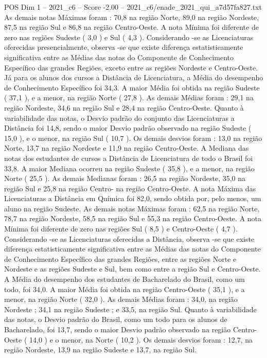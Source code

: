 \begin{textsample}{POS Dim 1 – 2021\_c6 – Score -2.00 – 2021\_c6/enade\_2021\_qui\_a7d57fa827.txt}
As demais notas Máximas foram : 70,8 na região Norte, 89,0 na região Nordeste, 87,5 na região Sul e 86,8 na região Centro-Oeste.
A nota Mínima foi diferente de zero nas regiões Sudeste ( 3,0 ) e Sul ( 4,3 ).
Considerando -se as Licenciaturas oferecidas presencialmente, observa -se que existe diferença estatisticamente significativa entre as Médias das notas do Componente de Conhecimento Específico das grandes Regiões, exceto entre as regiões Nordeste e Centro-Oeste.
Já para os alunos dos cursos a Distância de Licenciatura, a Média do desempenho de Conhecimento Específico foi 34,3.
A maior Média foi obtida na região Sudeste ( 37,1 ), e a menor, na região Norte ( 27,8 ).
As demais Médias foram : 29,1 na região Nordeste, 34,6 na região Sul e 28,4 na região Centro-Oeste.
Quanto à variabilidade das notas, o Desvio padrão do conjunto das Licenciaturas a Distância foi 14,8, sendo o maior Desvio padrão observado na região Sudeste ( 15,0 ), e o menor, na região Sul ( 10,7 ).
Os demais desvios foram : 13,0 na região Norte, 13,7 na região Nordeste e 11,9 na região Centro-Oeste.
A Mediana das notas dos estudantes de cursos a Distância de Licenciatura de todo o Brasil foi 33,8.
A maior Mediana ocorreu na região Sudeste ( 35,8 ), e a menor, na região Norte ( 25,5 ).
As demais Medianas foram : 26,5 na região Nordeste, 35,0 na região Sul e 25,8 na região Centro- na região Centro-Oeste.
A nota Máxima das Licenciaturas a Distância em Química foi 82,0, sendo obtida por, pelo menos, um aluno na região Sudeste.
As demais notas Máximas foram : 62,5 na região Norte, 78,7 na região Nordeste, 58,5 na região Sul e 55,3 na região Centro-Oeste.
A nota Mínima foi diferente de zero nas regiões Sul ( 8,5 ) e Centro-Oeste ( 4,7 ).
Considerando -se as Licenciaturas oferecidas a Distância, observa -se que existe diferença estatisticamente significativa entre as Médias das notas do Componente de Conhecimento Específico das grandes Regiões, entre as regiões Norte e Nordeste e as regiões Sudeste e Sul, bem como entre a região Sul e Centro-Oeste.
A Média do desempenho dos estudantes de Bacharelado do Brasil, como um todo, foi 34,0.
A maior Média foi obtida na região Centro-Oeste ( 35,1 ), e a menor, na região Norte ( 32,0 ).
As demais Médias foram : 34,0, na região Nordeste ; 34,1 na região Sudeste ; e 33,5, na região Sul.
Quanto à variabilidade das notas, o Desvio padrão do Brasil, como um todo para os alunos de Bacharelado, foi 13,7, sendo o maior Desvio padrão observado na região Centro-Oeste ( 14,0 ) e o menor, na Norte ( 10,2 ).
Os demais desvios foram : 12,7, na região Nordeste, 13,9 na região Sudeste e 13,7, na região Sul.

\end{textsample}

